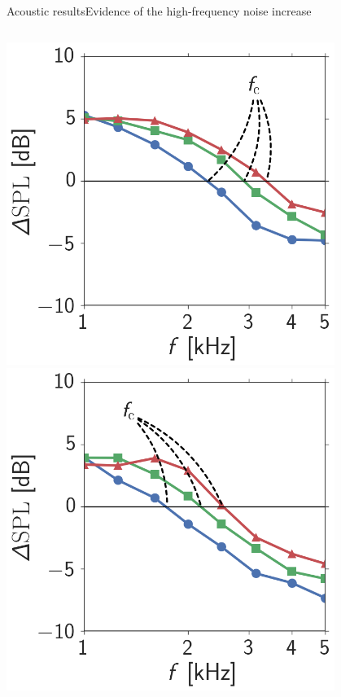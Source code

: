 \documentclass[xcolor=table,aspectratio=169]{beamer}
\begin{document}
\begin{frame}{Acoustic results}{Evidence of the high-frequency noise increase}

    \vspace{2cm}
    \begin{columns}
        \centering
        \includegraphics[width=0.8\textwidth]{scripts/acoustics/article_images/Relative_a0_p6.png}
        \centering
        \includegraphics[width=0.8\textwidth]{scripts/acoustics/article_images/Relative_a6_p6.png}
        \centering

\end{columns}
\end{frame}
\end{document}
